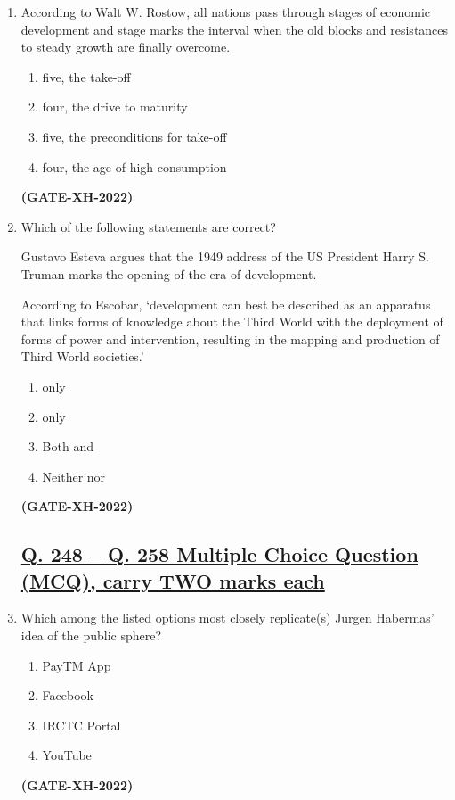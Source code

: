 \documentclass[journal]{IEEEtran}
\begin{document}
\begin{enumerate}
\item
According to Walt W. Rostow, all nations pass through \underline{\hspace{1cm}} stages of economic development and \underline{\hspace{1cm}} stage marks the interval when the old blocks and resistances to steady growth are finally overcome.
\begin{multicols}{2}
\begin{enumerate}
\item five, the take-off
\item four, the drive to maturity
\item five, the preconditions for take-off
\item four, the age of high consumption
\end{enumerate}
\end{multicols}
\hfill\textbf{(GATE-XH-2022)}

\item Which of the following statements are correct?

 Gustavo Esteva argues that the 1949 address of the US President Harry S. Truman marks the opening of the era of development.

 According to Escobar, ‘development can best be described as an apparatus that links forms of knowledge about the Third World with the deployment of forms of power and intervention, resulting in the mapping and production of Third World societies.’
\begin{multicols}{2}
\begin{enumerate}
\item {} only
\item {} only
\item Both  and 
\item Neither  nor 
\end{enumerate}
\end{multicols}
\hfill\textbf{(GATE-XH-2022)}

\subsection*{\underline{\textbf {Q. 248 – Q. 258 Multiple Choice Question (MCQ), carry TWO marks each}}}

\item
Which among the listed options most closely replicate(s) Jurgen Habermas’ idea of the public sphere?
\begin{multicols}{4}
\begin{enumerate}
\item PayTM App
\item Facebook
\item IRCTC Portal
\item YouTube
\end{enumerate}
\end{multicols}
\hfill\textbf{(GATE-XH-2022)}


\end{enumerate}
\end{document}
